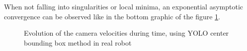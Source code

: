 When not falling into singularities or local minima, an exponential asymptotic convergence can be observed like in the bottom graphic of the figure \ref{pict:yolo_real_plot}.
\newpage
\begin{figure}[!ht]
     \centering
     \label{<figure_simulation>]}
     \label{<figure_real>]}
     \caption{Evolution of the camera velocities during time, using YOLO center bounding box method in real robot}
     \label{pict:yolo_real_plot}
\end{figure}

